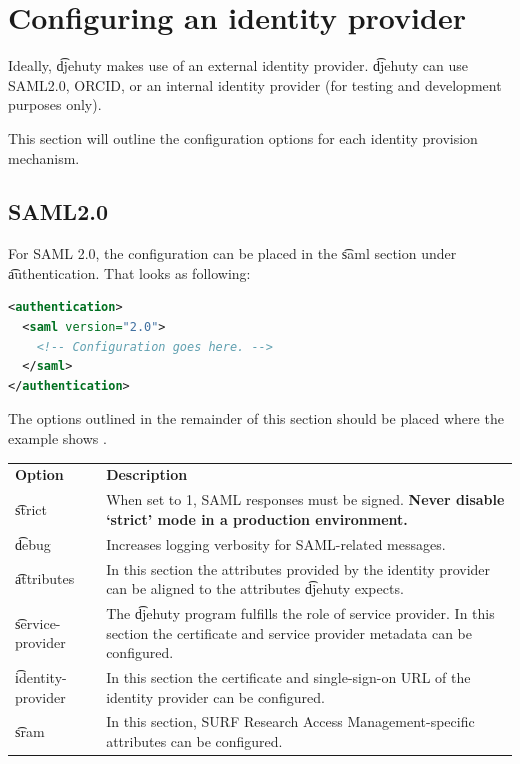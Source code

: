 \section{Configuring an identity provider}

  Ideally, \t{djehuty} makes use of an external identity provider.
  \t{djehuty} can use SAML2.0, ORCID, or an internal identity provider
  (for testing and development purposes only).

  This section will outline the configuration options for each
  identity provision mechanism.

\subsection {SAML2.0}

  For SAML 2.0, the configuration can be placed in the \t{saml}
  section under \t{authentication}.  That looks as following:

\begin{lstlisting}[language=xml]
<authentication>
  <saml version="2.0">
    <!-- Configuration goes here. -->
  </saml>
</authentication>
\end{lstlisting}

  The options outlined in the remainder of this section should be placed
  where the example shows .

\begin{tabularx}{\textwidth}{*{1}{!{\VRule[-1pt]}l}!{\VRule[-1pt]}X}
  \headrow
  \textbf{Option}             & \textbf{Description}\\
  \t{strict}                  & When set to 1, SAML responses must be signed.
                                \textbf{Never disable `strict' mode in a
                                production environment.}\\
  \t{debug}                   & Increases logging verbosity for SAML-related messages.\\
  \t{attributes}              & In this section the attributes provided by the
                                identity provider can be aligned to the
                                attributes \t{djehuty} expects.\\
  \t{service-provider}        & The \t{djehuty} program fulfills the role of
                                service provider.  In this section the
                                certificate and service provider metadata
                                can be configured.\\
  \t{identity-provider}       & In this section the certificate and
                                single-sign-on URL of the identity provider
                                can be configured.\\
  \t{sram}                    & In this section, SURF Research Access
                                Management-specific attributes can be
                                configured.
\end{tabularx}

